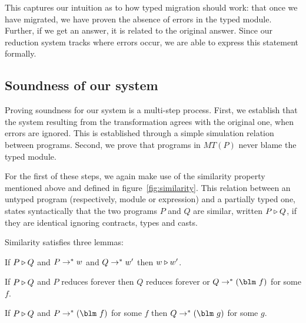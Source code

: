 {This captures our intuition as to how typed migration should work:
that once we have migrated, we have proven the absence of errors in
the typed module.  Further, if we get an answer, it is related to the
original answer.  Since our reduction system tracks where errors occur, we are
able to express this statement formally.

\subsection{Soundness of our system}

Proving soundness for our system is a multi-step process.  First, we
establish that the  system resulting from the transformation agrees
with the original one, when 
errors are ignored.  This is established through a simple simulation relation
between programs.  Second, we prove that programs in $MT(P)$ never
blame the typed module. 

For the first of these steps, we again make use of the similarity property
mentioned above and defined in figure~\ref{fig:similarity}.
This relation between an untyped program (respectively, module or
expression) and a partially typed one, states syntactically that the
two programs $P$ and $Q$ are similar, written
$P \triangleright Q$, if they are identical ignoring contracts, types
and casts.

Similarity satisfies three lemmas:

\begin{lemma}
  If $P \triangleright Q$ and $P \rightarrow^* w$ and $Q \rightarrow^* w'$ then $w \triangleright w'$.
\end{lemma}

\begin{lemma}
  If $P \triangleright Q$ and $P$ reduces forever then $Q$ reduces
  forever or $Q \dlsreduces \blame{f}$ for some $f$.
\end{lemma}

\begin{lemma}
  If $P \triangleright Q$ and $P \dlsreduces \blame{f}$ for some $f$ then $Q
  \dlsreduces \blame{g}$ for some $g$.\end{lemma}

}
